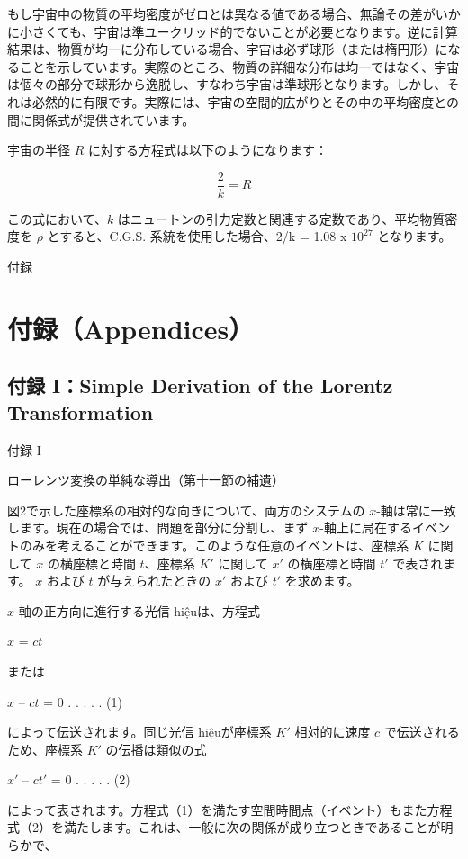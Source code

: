 \documentclass[a4paper,11pt,openany]{ltjsbook}
\begin{document}
もし宇宙中の物質の平均密度がゼロとは異なる値である場合、無論その差がいかに小さくても、宇宙は準ユークリッド的でないことが必要となります。逆に計算結果は、物質が均一に分布している場合、宇宙は必ず球形（または楕円形）になることを示しています。実際のところ、物質の詳細な分布は均一ではなく、宇宙は個々の部分で球形から逸脱し、すなわち宇宙は準球形となります。しかし、それは必然的に有限です。実際には、宇宙の空間的広がりとその中の平均密度との間に関係式が提供されています。

宇宙の半径 \( R \) に対する方程式は以下のようになります：

\[
\frac{2}{k} = R
\]

この式において、\( k \) はニュートンの引力定数と関連する定数であり、平均物質密度を \( \rho \) とすると、C.G.S. 系統を使用した場合、2/k = 1.08 x $10^{27}$ となります。

付録


\clearpage
\part{付録（Appendices）}



\clearpage
\chapter{付録 I：Simple Derivation of the Lorentz Transformation}

付録 I

ローレンツ変換の単純な導出（第十一節の補遺）

図2で示した座標系の相対的な向きについて、両方のシステムの $x$-軸は常に一致します。現在の場合では、問題を部分に分割し、まず $x$-軸上に局在するイベントのみを考えることができます。このような任意のイベントは、座標系 $K$ に関して $x$ の横座標と時間 $t$、座標系 $K′$ に関して $x′$ の横座標と時間 $t′$ で表されます。 $x$ および $t$ が与えられたときの $x′$ および $t′$ を求めます。

$x$ 軸の正方向に進行する光信 hiệuは、方程式

$x$ = $ct$

または

$x$ – $ct$ = 0 . . . . . (1)

によって伝送されます。同じ光信 hiệuが座標系 $K′$ 相対的に速度 $c$ で伝送されるため、座標系 $K′$ の伝播は類似の式

$x′$ – $ct′$ = 0 . . . . . (2)

によって表されます。方程式（1）を満たす空間時間点（イベント）もまた方程式（2）を満たします。これは、一般に次の関係が成り立つときであることが明らかで、
\end{document}
